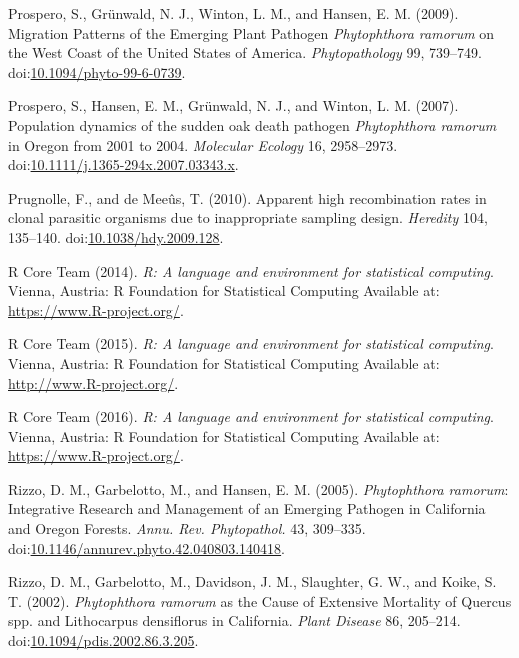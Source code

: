 \documentclass[double,12pt]{beavtex}
\begin{document}
  \hypertarget{ref-prospero2009migration}{}
  Prospero, S., Grünwald, N. J., Winton, L. M., and Hansen, E. M. (2009).
  Migration Patterns of the Emerging Plant Pathogen \emph{Phytophthora
  ramorum} on the West Coast of the United States of America.
  \emph{Phytopathology} 99, 739--749.
  doi:\href{https://doi.org/10.1094/phyto-99-6-0739}{10.1094/phyto-99-6-0739}.
  
  \hypertarget{ref-prospero2007population}{}
  Prospero, S., Hansen, E. M., Grünwald, N. J., and Winton, L. M. (2007).
  Population dynamics of the sudden oak death pathogen \emph{Phytophthora
  ramorum} in Oregon from 2001 to 2004. \emph{Molecular Ecology} 16,
  2958--2973.
  doi:\href{https://doi.org/10.1111/j.1365-294x.2007.03343.x}{10.1111/j.1365-294x.2007.03343.x}.
  
  \hypertarget{ref-prugnolle2010apparent}{}
  Prugnolle, F., and de Meeûs, T. (2010). Apparent high recombination
  rates in clonal parasitic organisms due to inappropriate sampling
  design. \emph{Heredity} 104, 135--140.
  doi:\href{https://doi.org/10.1038/hdy.2009.128}{10.1038/hdy.2009.128}.
  
  \hypertarget{ref-R2014}{}
  R Core Team (2014). \emph{R: A language and environment for statistical
  computing}. Vienna, Austria: R Foundation for Statistical Computing
  Available at: \url{https://www.R-project.org/}.
  
  \hypertarget{ref-R}{}
  R Core Team (2015). \emph{R: A language and environment for statistical
  computing}. Vienna, Austria: R Foundation for Statistical Computing
  Available at: \url{http://www.R-project.org/}.
  
  \hypertarget{ref-R2016}{}
  R Core Team (2016). \emph{R: A language and environment for statistical
  computing}. Vienna, Austria: R Foundation for Statistical Computing
  Available at: \url{https://www.R-project.org/}.
  
  \hypertarget{ref-rizzo2005phytophthora}{}
  Rizzo, D. M., Garbelotto, M., and Hansen, E. M. (2005).
  \emph{Phytophthora ramorum}: Integrative Research and Management of an
  Emerging Pathogen in California and Oregon Forests. \emph{Annu. Rev.
  Phytopathol.} 43, 309--335.
  doi:\href{https://doi.org/10.1146/annurev.phyto.42.040803.140418}{10.1146/annurev.phyto.42.040803.140418}.
  
  \hypertarget{ref-rizzo2002phytophthora}{}
  Rizzo, D. M., Garbelotto, M., Davidson, J. M., Slaughter, G. W., and
  Koike, S. T. (2002). \emph{Phytophthora ramorum} as the Cause of
  Extensive Mortality of Quercus spp. and Lithocarpus densiflorus in
  California. \emph{Plant Disease} 86, 205--214.
  doi:\href{https://doi.org/10.1094/pdis.2002.86.3.205}{10.1094/pdis.2002.86.3.205}.
  
\end{document}
